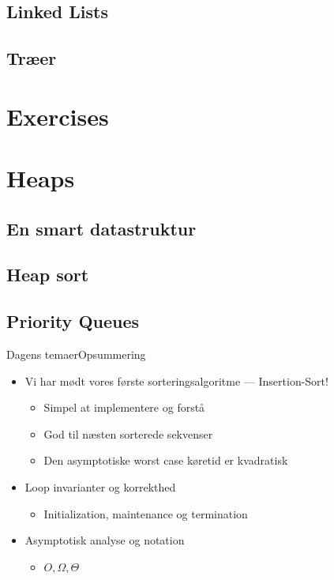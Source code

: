 \documentclass[aspectratio=1610]{beamer}
\begin{document}
\subsection{Linked Lists}

\subsection{Træer}

\section{Exercises}

\section{Heaps}

\subsection{En smart datastruktur}

\subsection{Heap sort}

\subsection{Priority Queues}




\begin{frame}{Dagens temaer}{Opsummering}
    \begin{itemize}
        \item Vi har mødt vores første sorteringsalgoritme --- Insertion-Sort!
            \begin{itemize}
                \item Simpel at implementere og forstå
                \item God til næsten sorterede sekvenser
                \item Den asymptotiske worst case køretid er kvadratisk
            \end{itemize}
        \item Loop invarianter og korrekthed
            \begin{itemize}
                \item Initialization, maintenance og termination
            \end{itemize}
        \item Asymptotisk analyse og notation
            \begin{itemize}
                \item $O, \Omega, \Theta$
            \end{itemize}
    \end{itemize}
\end{frame}
\end{document}
